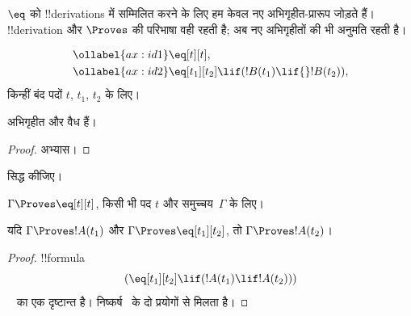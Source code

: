 \documentclass[../../../include/open-logic-section]{subfiles}
\begin{document}


$\eq$ को !!{derivation}s में सम्मिलित करने के लिए हम केवल नए अभिगृहीत-प्रारूप
जोड़ते हैं। !!{derivation} और $\Proves$ की परिभाषा वही रहती है; अब नए
अभिगृहीतों की भी अनुमति रहती है।

\begin{defn}[!!{identity} के अभिगृहीत]
\begin{align}
\ollabel{ax:id1} & \eq[t][t], \\
\ollabel{ax:id2} & \eq[t_1][t_2] \lif (!B(t_1) \lif
  {}!B(t_2)),
\end{align}
किन्हीं बंद पदों $t$, $t_1$, $t_2$ के लिए।
\end{defn}

\begin{prop}
  अभिगृहीत  और  वैध हैं।
\end{prop}

\begin{proof}
  अभ्यास।
\end{proof}

\begin{prob}
 सिद्ध कीजिए।
\end{prob}

\begin{prop}
 $\Gamma \Proves \eq[t][t]$, किसी भी पद $t$ और समुच्चय~$\Gamma$ के लिए।
\end{prop}

\begin{prop}
  यदि $\Gamma \Proves !A(t_1)$ और $\Gamma \Proves
  \eq[t_1][t_2]$, तो $\Gamma \Proves !A(t_2)$।
\end{prop}

\begin{proof}
!!{formula}
\[
(\eq[t_1][t_2] \lif (!A(t_1) \lif !A(t_2)))
\]
~ का एक दृष्टान्त है। निष्कर्ष~\MP{} के दो प्रयोगों से मिलता है।
\end{proof}
\end{document}
